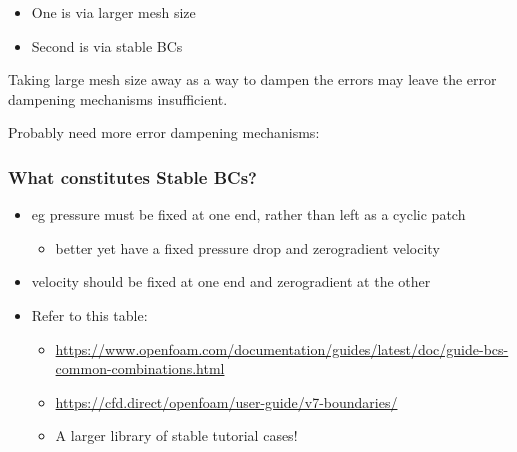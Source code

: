\documentclass[12pt]{article}
\renewcommand{\_}{\kern-1.5pt\textunderscore\kern-1.5pt}
\begin{document}
\begin{itemize}


	\item One is via larger mesh size\par

	\item Second is via stable BCs\par
\end{itemize}
Taking large mesh size away as a way to dampen the errors may leave the error dampening mechanisms insufficient.\par

Probably need more error dampening mechanisms:\par



\subsubsection{What constitutes Stable BCs?} \par

\begin{itemize}
	\item eg pressure must be fixed at one end, rather than left as a cyclic patch\par

\begin{itemize}
	\item better yet have a fixed pressure drop and zerogradient velocity\par


\end{itemize}
	\item velocity should be fixed at one end and zerogradient at the other\par

	\item Refer to this table:\par

\begin{itemize}
	\item \href{https://www.openfoam.com/documentation/guides/latest/doc/guide-bcs-common-combinations.html}{https://www.openfoam.com/documentation/guides/latest/doc/guide-bcs-common-combinations.html}\par

	\item \href{https://cfd.direct/openfoam/user-guide/v7-boundaries/}{https://cfd.direct/openfoam/user-guide/v7-boundaries/}\par
	\item A larger library of stable tutorial cases!\par


\end{itemize}
\end{itemize}
\end{document}

